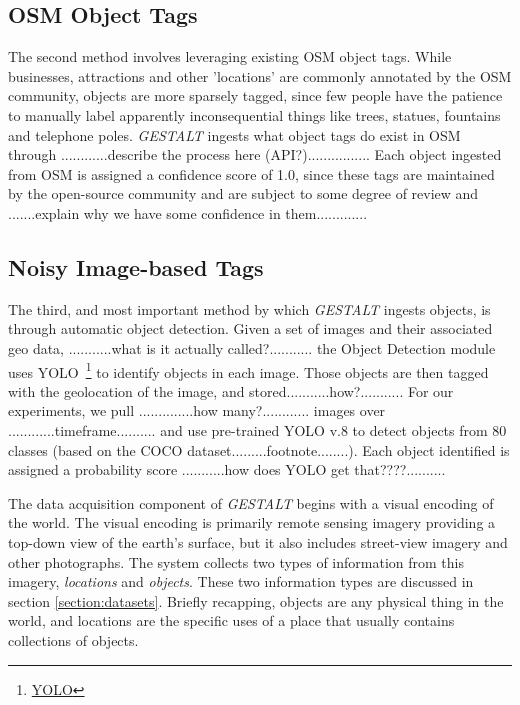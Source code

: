 
\subsection{OSM Object Tags}
The second method involves leveraging existing OSM object tags.
While businesses, attractions and other 'locations' are commonly annotated by the OSM community, objects are more sparsely tagged, since few people have the patience to manually label apparently inconsequential things like trees, statues, fountains and telephone poles. 
\emph{GESTALT} ingests what object tags do exist in OSM through 
............describe the process here (API?)................
Each object ingested from OSM is assigned a confidence score of 1.0, since these tags are maintained by the open-source community and are subject to some degree of review and .......explain why we have some confidence in them.............


\subsection{Noisy Image-based Tags}
The third, and most important method by which \emph{GESTALT} ingests objects, is through automatic object detection.
Given a set of images and their associated geo data, ...........what is it actually called?........... the Object Detection module uses YOLO~\footnote{\href{https://github.com/ultralytics/ultralytics}{YOLO}} to identify objects in each image. Those objects are then tagged with the geolocation of the image, and stored...........how?........... For our experiments, we pull ..............how many?............ images over ............timeframe.......... and use pre-trained YOLO v.8 to detect objects from 80 classes (based on the COCO dataset.........footnote........). Each object identified is assigned a probability score ...........how does YOLO get that????..........



The data acquisition component of \textit{GESTALT} begins with a visual encoding of the world. 
The visual encoding is primarily remote sensing imagery providing a top-down view of the earth's surface, but it also includes street-view imagery and other photographs. 
The system collects two types of information from this imagery, \textit{locations} and \textit{objects}. 
These two information types are discussed in section \ref{section:datasets}. 
Briefly recapping, objects are any physical thing in the world, and locations are the specific uses of a place that usually contains collections of objects. 

